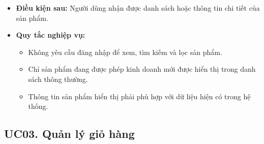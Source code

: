 \documentclass[12pt,a4paper]{article}
\begin{document}
\begin{itemize}
    \item \textbf{Điều kiện sau:} Người dùng nhận được danh sách hoặc thông tin chi tiết của sản phẩm.

    \item \textbf{Quy tắc nghiệp vụ:}
    \begin{itemize}
        \item Không yêu cầu đăng nhập để xem, tìm kiếm và lọc sản phẩm.
        \item Chỉ sản phẩm đang được phép kinh doanh mới được hiển thị trong danh sách thông thường.
        \item Thông tin sản phẩm hiển thị phải phù hợp với dữ liệu hiện có trong hệ thống.
    \end{itemize}

\end{itemize}

\subsection*{UC03. Quản lý giỏ hàng}
\end{document}
